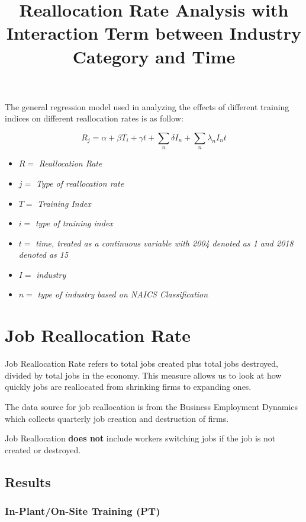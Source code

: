 \documentclass[
]{article}
\title{Reallocation Rate Analysis with Interaction Term between Industry
Category and Time}
\author{}
\date{\vspace{-2.5em}}
\providecommand{\tightlist}{%
  \setlength{\itemsep}{0pt}\setlength{\parskip}{0pt}}
\begin{document}
\maketitle

The general regression model used in analyzing the effects of different
training indices on different reallocation rates is as follow:

\[R_j = \alpha + \beta T_i + \gamma t + \sum_n \delta I_n + \sum_n \lambda_n I_n t\]

\begin{itemize}
\tightlist
\item
  \(R =\) \emph{Reallocation Rate}
\item
  \(j =\) \emph{Type of reallocation rate }
\item
  \(T =\) \emph{Training Index}
\item
  \(i =\) \emph{type of training index}
\item
  \(t =\) \emph{time, treated as a continuous variable with 2004 denoted
  as 1 and 2018 denoted as 15 }
\item
  \(I =\) \emph{industry}
\item
  \(n =\) \emph{type of industry based on NAICS Classification}
\end{itemize}

\hypertarget{job-reallocation-rate}{%
\section{Job Reallocation Rate}\label{job-reallocation-rate}}

Job Reallocation Rate refers to total jobs created plus total jobs
destroyed, divided by total jobs in the economy. This measure allows us
to look at how quickly jobs are reallocated from shrinking firms to
expanding ones.

The data source for job reallocation is from the Business Employment
Dynamics which collects quarterly job creation and destruction of firms.

Job Reallocation \textbf{does not} include workers switching jobs if the
job is not created or destroyed.

\hypertarget{results}{%
\subsection{Results}\label{results}}

\hypertarget{in-planton-site-training-pt}{%
\subsubsection{In-Plant/On-Site Training
(PT)}\label{in-planton-site-training-pt}}
\end{document}
